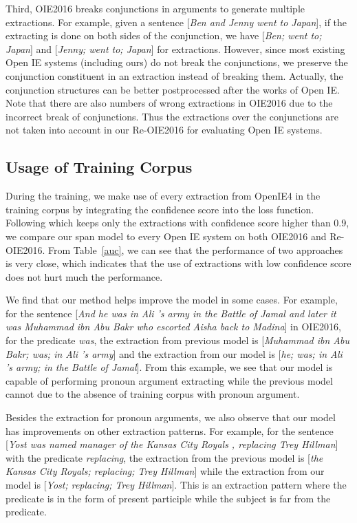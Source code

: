 \documentclass[letterpaper]{article} %
\begin{document}
Third, OIE2016 breaks conjunctions in arguments to generate multiple extractions. For example, given a sentence [\emph{Ben and Jenny went to Japan}], if the extracting is done on both sides of the conjunction, we have [\emph{Ben; went to; Japan}] and [\emph{Jenny; went to; Japan}] for extractions. However, since most existing Open IE systems (including ours) do not break the conjunctions, we preserve the conjunction constituent in an extraction instead of breaking them. Actually, the conjunction structures can be better postprocessed after the works of Open IE. Note that there are also numbers of wrong extractions in OIE2016 due to the incorrect break of conjunctions. Thus the extractions over the conjunctions are not taken into account in our Re-OIE2016 for evaluating Open IE systems.



\subsection{Usage of Training Corpus}
During the training, we make use of every extraction from OpenIE4 in the training corpus by integrating the confidence score into the loss function. Following \cite{Cui2018NeuralOI} which keeps only the extractions with confidence score higher than 0.9, we compare our span model to every Open IE system on both OIE2016 and Re-OIE2016. From Table~\ref{auc}, we can see that the performance of two approaches is very close, which indicates that the use of extractions with low confidence score does not hurt much the performance.

We find that our method helps improve the model in some cases. For example, for the sentence [\emph{And he was in Ali 's army in the Battle of Jamal and later it was Muhammad ibn Abu Bakr who escorted Aisha back to Madina}] in OIE2016, for the predicate \emph{was}, the extraction from previous model is [\emph{Muhammad ibn Abu Bakr; was; in Ali 's army}] and the extraction from  our model is [\emph{he; was; in Ali 's army; in the Battle of Jamal}]. From this example, we see that our model is capable of performing pronoun argument extracting while the previous model cannot due to the absence of training corpus with pronoun argument.

Besides the extraction for pronoun arguments, we also observe that our model has improvements on other extraction patterns. For example, for the sentence [\emph{Yost was named manager of the Kansas City Royals , replacing Trey Hillman}] with the predicate \emph{replacing}, the extraction from the previous model is [\emph{the Kansas City Royals; replacing; Trey Hillman}] while the extraction from our model is [\emph{Yost; replacing; Trey Hillman}]. This is an extraction pattern where the predicate is in the form of present participle while the subject is far from the predicate.
\end{document}
